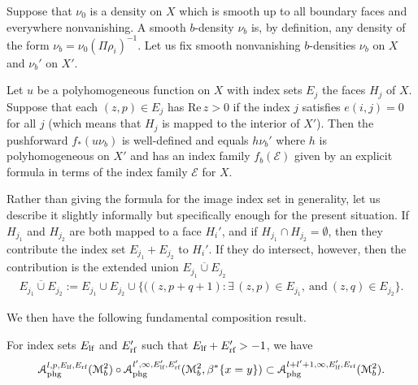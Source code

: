 Suppose that $\nu_0$ is a density on $X$ which is smooth up to all boundary faces and everywhere nonvanishing. 
A smooth $b$-density $\nu_b$ is, by definition, any density of the form $\nu_b =\nu_0 (\Pi \rho_i)^{-1}$.  
Let us fix smooth nonvanishing $b$-densities $\nu_b$ on $X$ and $\nu_b'$ on $X'$. 
\begin{prop}
Let $u$ be a polyhomogeneous function on $X$ with index sets  $E_j$ the faces $H_j$ of $X$.  Suppose that each $(z,p) \in E_j$
has $\mbox{Re}\, z > 0$ if the index $j$ satisfies $e(i,j) = 0$ for all $j$ (which means that $H_j$ is mapped to the interior of $X'$).
Then the pushforward $f_* (u \nu_b)$ is well-defined and equals $h \nu_b'$ where $h$ is polyhomogeneous on $X'$ and has
an index family $f_b(\mathcal{E})$ given by an explicit formula in terms of the index family $\mathcal{E}$ for $X$.
\end{prop}
Rather than giving the formula for the image index set in generality, let us describe it slightly informally but specifically
enough for the present situation.  If $H_{j_1}$ and $H_{j_2}$ are both mapped to a face $H_i'$, and if $H_{j_1} \cap H_{j_2} = \emptyset$,
then they contribute the index set $E_{j_1} + E_{j_2}$ to $H_i'$. If they do intersect, however, then the contribution is the
extended union $E_{j_1} \overline{\cup} E_{j_2}$
\begin{align*}
E_{j_1} \overline{\cup} E_{j_2} := E_{j_1} \cup E_{j_2} \cup \{((z, p + q + 1): \exists \, (z,p) \in E_{j_1},\ 
\mbox{and}\  (z,q) \in E_{j_2} \}.
\end{align*}

We then 
have the following fundamental composition result.

\begin{prop}
\label{composition}
For index sets $E_{\lf}$ and $E'_{\rf}$ such that $E_{\lf}+E'_{\rf}>-1$, we have
\[
\mathscr{A}_{\textup{phg}}^{l,p,E_{\textup{lf}}, E_{\textup{rf}}}(\mathscr{M}^2_b) \circ 
\mathscr{A}_{\textup{phg}}^{l',\infty,E'_{\textup{lf}}, E'_{\textup{rf}}}(\mathscr{M}^2_b,\beta^*\{x=y\}) \subset 
\mathscr{A}_{\textup{phg}}^{l+l'+1,\infty, E'_{\textup{lf}}, E_{\textup{rf}}}(\mathscr{M}^2_b).
\]
\end{prop}

